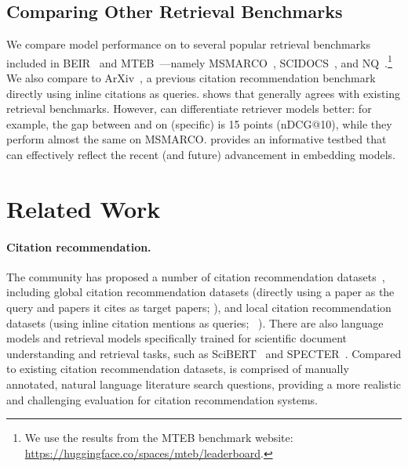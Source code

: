 \subsection{Comparing Other Retrieval Benchmarks}
\label{sec:comp_existing_benchmarks}

We compare model performance on \ours{}
to several popular retrieval benchmarks included in BEIR~\citep{thakur2021beir} and MTEB~\citep{muennighoff2022mteb}---namely MSMARCO~\citep{nguyen2017ms}, SCIDOCS~\citep{cohan-etal-2020-specter}, and NQ~\citep{lee-etal-2019-latent}.\footnote{We use the results from the MTEB benchmark website: \url{https://huggingface.co/spaces/mteb/leaderboard}.} 
We also compare to ArXiv~\citep{gu2022local}, a previous citation recommendation benchmark directly using inline citations as queries. 
 shows that 
\ours{} generally agrees with existing retrieval benchmarks.
However, 
\ours{} can differentiate retriever models better: for example, the gap between \grit{} and \efive{} on \ours{} (specific) is 15 points (nDCG@10), while they perform almost the same on MSMARCO. 
\ours{} provides an informative testbed that can effectively reflect the recent (and future) advancement in embedding models.

\section{Related Work}
\label{sec:relatedwork}

\paragraph{Citation recommendation.} 
The community has proposed a number of citation recommendation datasets~\cite{farber2020citation},
including global citation recommendation datasets (directly using a paper as the query and papers it cites as target papers; \citealp{cohan-etal-2020-specter,bhagavatula-etal-2018-content}), and 
local citation recommendation datasets (using inline citation mentions as queries; ~\citealp{he2010context,medic-snajder-2020-improved,Jeong2020,gu2022local}).
There are also language models and retrieval models specifically trained for scientific document understanding and retrieval tasks, such as SciBERT~\cite{beltagy-etal-2019-scibert} and SPECTER~\cite{cohan-etal-2020-specter}.
Compared to existing citation recommendation datasets,
\ours{} is comprised of manually annotated, natural language literature search questions,
providing a more realistic and challenging evaluation for citation recommendation systems.


